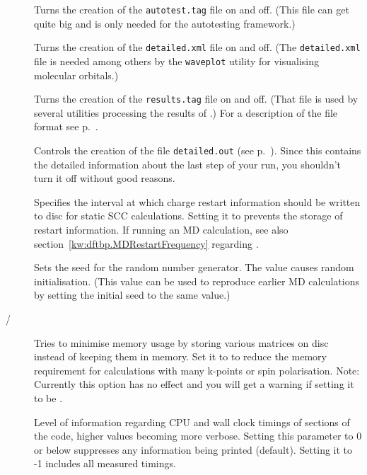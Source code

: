 \begin{description}

\item[] Turns the creation of the
  \verb|autotest.tag| file on and off. (This file can get quite big
  and is only needed for the autotesting framework.)

\item[] Turns the creation of the
  \verb|detailed.xml| file on and off. (The \verb|detailed.xml| file
  is needed among others by the \verb|waveplot| utility for
  visualising molecular orbitals.)

\item[] Turns the creation of the \verb|results.tag| file on
  and off. (That file is used by several utilities processing the results of
  \dftbp.) For a description of the file format see
  p.~.

\item[] Controls the creation of the file
  \verb|detailed.out| (see p.~). Since this contains
  the detailed information about the last step of your run, you shouldn't turn
  it off without good reasons.

\item[] Specifies the interval at which charge
  restart information should be written to disc for static SCC
  calculations. Setting it to  prevents the storage of restart
  information. If running an MD calculation, see also
  section~\ref{kw:dftbp.MDRestartFrequency} regarding .

\item[] Sets the seed for the random number
  generator. The value  causes random initialisation. (This
  value can be used to reproduce earlier MD calculations by setting
  the initial seed to the same value.)

\item[ / ] Tries to minimise memory usage by
  storing various matrices on disc instead of keeping them in memory.
  Set it to  to reduce the memory requirement for calculations
  with many k-points or spin polarisation. Note: Currently this option has no
  effect and you will get a warning if setting it to be .

\item[] Level of information regarding CPU and wall clock
  timings of sections of the code, higher values becoming more verbose. Setting
  this parameter to 0 or below suppresses any information being printed
  (default). Setting it to -1 includes all measured timings.


\end{description}
